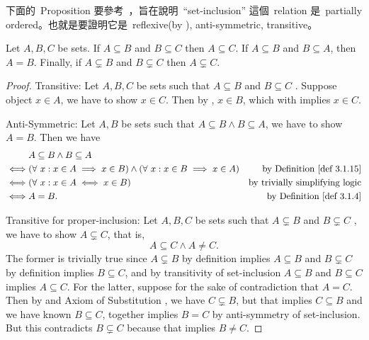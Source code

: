 \begin{note}
下面的\ Proposition 要參考\ ，旨在說明\ ``set-inclusion'' 這個\ relation 是\ partially ordered。也就是要證明它是\ reflexive(by ), anti-symmetric, transitive。
\end{note}

\begin{proposition}  \label{prop 3.1.18}
Let \(A, B, C\) be sets.
If \(A \subseteq B\) and \(B \subseteq C\) then \(A \subseteq C\).
If \(A \subseteq B\) and \(B \subseteq A\), then \(A = B\).
Finally, if \(A \subsetneq B\) and \(B \subsetneq C\) then \(A \subsetneq C\).
\end{proposition}

\begin{proof}
Transitive: Let \(A, B, C\) be sets such that \(A \subseteq B\)  and \(B \subseteq C\) . Suppose object \(x \in A\), we have to show \(x \in C\). Then by , \(x \in B\), which with  implies \(x \in C\).

Anti-Symmetric: Let \(A, B\) be sets such that \(A \subseteq B \land B \subseteq A\), we have to show \(A = B\). Then we have
\begin{align*}
     & A \subseteq B \land B \subseteq A \\
\iff & (\forall\ x : x \in A \implies x \in B) \land (\forall\ x : x \in B \implies x \in A) & \text{by \DEF{3.1.15}} \\
\iff & (\forall\ x : x \in A \iff x \in B) & \text{by trivially simplifying logic} \\
\iff & A = B. & \text{by \DEF{3.1.4}}
\end{align*}

Transitive for proper-inclusion: Let \(A, B, C\) be sets such that \(A \subsetneq B\)  and \(B \subsetneq C\) , we have to show \(A \subsetneq C\), that is,
\[
    A \subseteq C \land A \neq C.
\]
The former is trivially true since \(A \subsetneq B\) by definition implies \(A \subseteq B\) and \(B \subsetneq C\) by definition implies \(B \subseteq C\), and by transitivity of set-inclusion \(A \subseteq B\) and \(B \subseteq C\) implies \(A \subseteq C\).
For the latter, suppose for the sake of contradiction that \(A = C\). Then by  and Axiom of Substitution , we have \(C \subsetneq B\), but that implies \(C \subseteq B\) and we have known \(B \subseteq C\), together implies \(B = C\) by anti-symmetry of set-inclusion. But this contradicts \(B \subsetneq C\) because that implies \(B \neq C\).
\end{proof}

